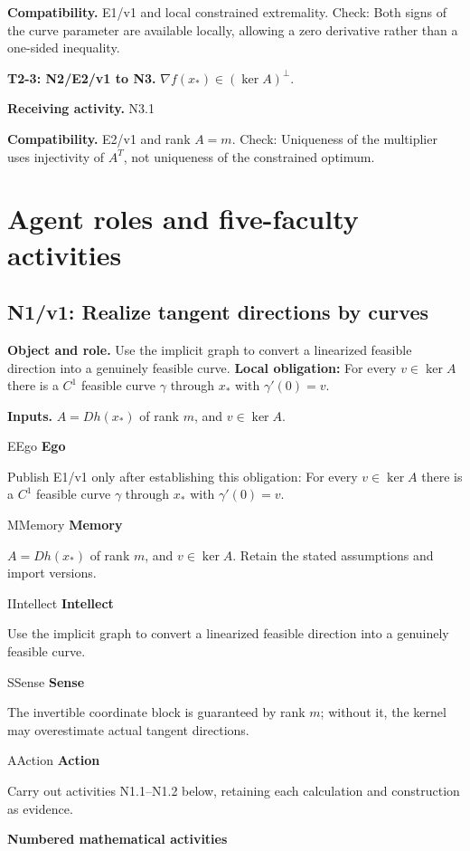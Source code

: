 \documentclass[preprint,12pt,aps,pra,showkeys,amsmath,amssymb,superscriptaddress,floatfix]{revtex4-2}
\theoremstyle{definition}
\theoremstyle{remark}
\newcommand{\mmfaculty}[3]{%
 \begin{mmfacultybox}{#1}{#2}
 {\sffamily\bfseries\color{MMBlue}#2}\par\smallskip #3
 \end{mmfacultybox}}
\newcommand{\field}[2]{\par\smallskip\noindent\textbf{#1.} #2\par}
\begin{document}
\field{Compatibility}{E1/v1 and local constrained extremality. Check: Both signs of the curve
parameter are available locally, allowing a zero derivative rather than
a one-sided inequality.}

\field{T2-3: N2/E2/v1 to N3}{\(\nabla f(x_*)\in(\ker A)^\perp\).}

\field{Receiving activity}{N3.1}

\field{Compatibility}{E2/v1 and rank \(A=m\). Check: Uniqueness of the multiplier uses
injectivity of \(A^T\), not uniqueness of the constrained optimum.}

\endgroup

\clearpage\section{Agent roles and five-faculty activities}\begingroup\small\linespread{1.05}\selectfont{}

\subsection{N1/v1: Realize tangent directions by curves}

\field{Object and role}{Use the implicit graph to convert a linearized feasible direction into a
genuinely feasible curve. \textbf{Local obligation:} For every
\(v\in\ker A\) there is a \(C^1\) feasible curve \(\gamma\) through
\(x_*\) with \(\gamma'(0)=v\).}

\field{Inputs}{\(A=Dh(x_*)\) of rank \(m\), and \(v\in\ker A\).}

\mmfaculty{E}{Ego}{Publish E1/v1 only after establishing this obligation: For every
\(v\in\ker A\) there is a \(C^1\) feasible curve \(\gamma\) through
\(x_*\) with \(\gamma'(0)=v\).}

\mmfaculty{M}{Memory}{\(A=Dh(x_*)\) of rank \(m\), and \(v\in\ker A\). Retain the stated
assumptions and import versions.}

\mmfaculty{I}{Intellect}{Use the implicit graph to convert a linearized feasible direction into a
genuinely feasible curve.}

\mmfaculty{S}{Sense}{The invertible coordinate block is guaranteed by rank \(m\); without it,
the kernel may overestimate actual tangent directions.}

\mmfaculty{A}{Action}{Carry out activities N1.1--N1.2 below, retaining each calculation and
construction as evidence.}

\smallskip\noindent\textbf{Numbered mathematical activities}
\end{document}
